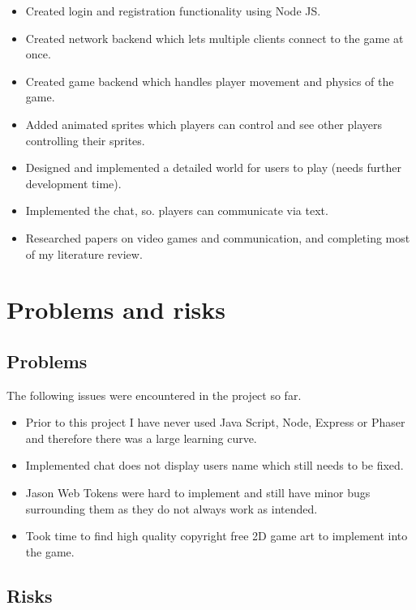 \documentclass[11pt]{article}
\begin{document}
\begin{itemize}
    \tightlist
\item Created login and registration functionality using Node JS.
\item Created network backend which lets multiple clients connect to the game at once.
\item Created game backend which handles player movement and physics of the game.
\item Added animated sprites which players can control and see other players controlling their sprites.
\item Designed and implemented a detailed world for users to play (needs further development time).
\item Implemented the chat, so. players can communicate via text.
\item Researched papers on video games and communication, and completing most of my literature review.

\end{itemize}

\section{Problems and risks}\label{problems-and-risks}

\subsection{Problems}\label{problems}

The following issues were encountered in the project so far.
\begin{itemize}
    \tightlist
\item Prior to this project I have never used Java Script, Node, Express or Phaser and therefore there was a large learning curve.
\item Implemented chat does not display users name which still needs to be fixed.

\item Jason Web Tokens were hard to implement and still have minor bugs surrounding them as they do not always work as intended.
\item 
Took time to find high quality copyright free 2D game art to implement into the game.
\end{itemize}

\subsection{Risks}\label{risks}
\end{document}
